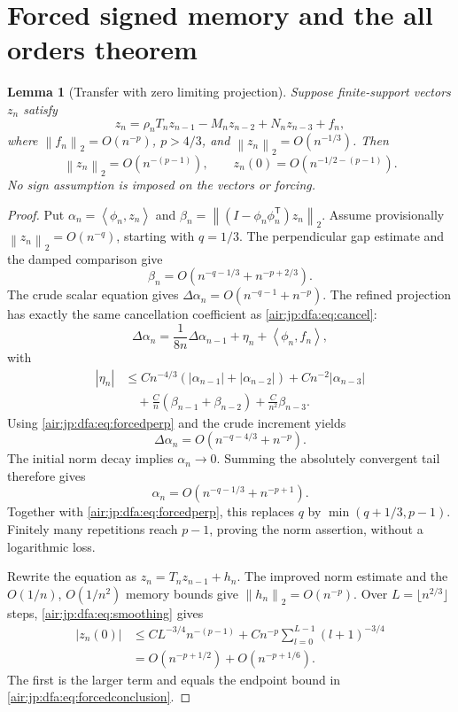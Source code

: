 \documentclass[11pt,letterpaper]{article}
\numberwithin{equation}{section}
\newtheorem{lemma}[theorem]{Lemma}
\theoremstyle{remark}
\newcommand{\ip}[2]{\left\langle#1,#2\right\rangle}
\newcommand{\normtwo}[1]{\left\lVert#1\right\rVert_2}
\begin{document}
\section{Forced signed memory and the all orders theorem}\label{air:jp:dfa:sec:transfer}
\begin{lemma}[Transfer with zero limiting projection]\label{air:jp:dfa:lem:forced}
Suppose finite-support vectors $z_n$ satisfy
\[
 z_n=\rho_nT_nz_{n-1}-M_nz_{n-2}+N_nz_{n-3}+f_n,
\]
where $\normtwo{f_n}=O(n^{-p})$, $p>4/3$, and $\normtwo{z_n}=O(n^{-1/3})$. Then
\begin{equation}\label{air:jp:dfa:eq:forcedconclusion}
 \normtwo{z_n}=O(n^{-(p-1)}),\qquad z_n(0)=O(n^{-1/2-(p-1)}).
\end{equation}
No sign assumption is imposed on the vectors or forcing.
\end{lemma}
\begin{proof}
Put $\alpha_n=\ip{\phi_n}{z_n}$ and $\beta_n=\normtwo{(I-\phi_n\phi_n^{\mathsf T})z_n}$. Assume provisionally $\normtwo{z_n}=O(n^{-q})$, starting with $q=1/3$. The perpendicular gap estimate and the damped comparison give
\begin{equation}\label{air:jp:dfa:eq:forcedperp}
 \beta_n=O(n^{-q-1/3}+n^{-p+2/3}).
\end{equation}
The crude scalar equation gives $\Delta\alpha_n=O(n^{-q-1}+n^{-p})$. The refined projection has exactly the same cancellation coefficient as \eqref{air:jp:dfa:eq:cancel}:
\[
 \Delta\alpha_n=\frac1{8n}\Delta\alpha_{n-1}+\eta_n+\ip{\phi_n}{f_n},
\]
with
\begin{align*}
 |\eta_n|&\le Cn^{-4/3}(|\alpha_{n-1}|+|\alpha_{n-2}|)
 +Cn^{-2}|\alpha_{n-3}|\\
 &\quad+\frac Cn(\beta_{n-1}+\beta_{n-2})+\frac C{n^2}\beta_{n-3}.
\end{align*}
Using \eqref{air:jp:dfa:eq:forcedperp} and the crude increment yields
\[
 \Delta\alpha_n=O(n^{-q-4/3}+n^{-p}).
\]
The initial norm decay implies $\alpha_n\to0$. Summing the absolutely convergent tail therefore gives
\[
 \alpha_n=O(n^{-q-1/3}+n^{-p+1}).
\]
Together with \eqref{air:jp:dfa:eq:forcedperp}, this replaces $q$ by $\min(q+1/3,p-1)$. Finitely many repetitions reach $p-1$, proving the norm assertion, without a logarithmic loss.

Rewrite the equation as $z_n=T_nz_{n-1}+h_n$. The improved norm estimate and the $O(1/n)$, $O(1/n^2)$ memory bounds give $\normtwo{h_n}=O(n^{-p})$. Over $L=\lfloor n^{2/3}\rfloor$ steps, \eqref{air:jp:dfa:eq:smoothing} gives
\begin{align*}
 |z_n(0)|&\le CL^{-3/4}n^{-(p-1)}
 +Cn^{-p}\sum_{l=0}^{L-1}(l+1)^{-3/4}\\
 &=O(n^{-p+1/2})+O(n^{-p+1/6}).
\end{align*}
The first is the larger term and equals the endpoint bound in \eqref{air:jp:dfa:eq:forcedconclusion}.
\end{proof}
\end{document}
